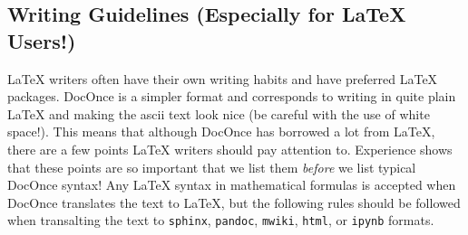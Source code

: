 \documentclass[%
oneside,                 %
final,                   %
10pt]{article}
\begin{document}
\subsection{Writing Guidelines (Especially for {\LaTeX} Users!)}
\label{manual:latex:guide}
{\LaTeX} writers often have their own writing habits and have preferred
{\LaTeX} packages. DocOnce is a simpler format and
corresponds to writing in quite plain {\LaTeX} and making the ascii text
look nice (be careful with the use of white space!). This means that
although DocOnce has borrowed a lot from {\LaTeX}, there are a few points
{\LaTeX} writers should pay attention to. Experience shows that these
points are so important that we list them \emph{before} we list typical
DocOnce syntax!
Any {\LaTeX} syntax in mathematical formulas is accepted when DocOnce
translates the text to {\LaTeX}, but the following rules should be
followed when transalting the text to \texttt{sphinx}, \texttt{pandoc},
\texttt{mwiki}, \texttt{html}, or \texttt{ipynb} formats.
\end{document}
